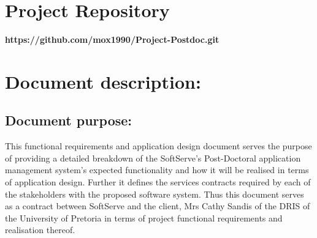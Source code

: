 \documentclass[12pt]{article}
\newcommand{\repo}{https://github.com/mox1990/Project-Postdoc.git}
\begin{document}
\newpage
\tableofcontents

\listoffigures
\newpage
\section{Project Repository}
\textbf{\repo}
\newpage
\section{Document description:}

\subsection{Document purpose:}
\vspace{0.2in}
This functional requirements and application design document serves the purpose of providing a detailed breakdown of the SoftServe's Post-Doctoral application management system's expected functionality and how it will be realised in terms of application design. Further it defines the services contracts required by each of the stakeholders with the proposed software system. Thus this document serves as a contract between SoftServe and the client, Mrs Cathy Sandis of the DRIS of the University of Pretoria in terms of project functional requirements and realisation thereof.

\vspace{0.2in}
\end{document}
